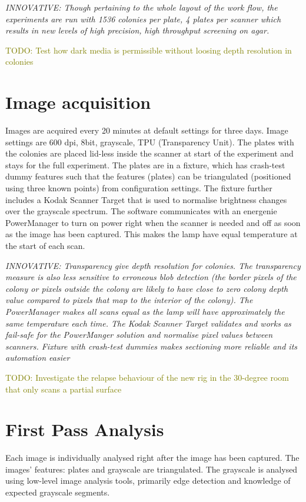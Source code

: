 \documentclass{article}
\newcommand{\todo}[1]{\textcolor{olive}{TODO: #1}}
\newcommand{\innovative}[1]{\emph{INNOVATIVE: #1}}
\begin{document}
\innovative{Though pertaining to the whole layout of the work flow, the
experiments are run with 1536 colonies per plate, 4 plates per scanner
which results in new levels of high precision, high throughput screening
on agar.}

\todo{Test how dark media is permissible without loosing depth resolution
in colonies}

\section{Image acquisition}

Images are acquired every 20 minutes at default settings for three days.
Image settings are 600 dpi, 8bit, grayscale, TPU (Transparency Unit).
The plates with the colonies are placed lid-less inside the scanner at start
of the experiment and stays for the full experiment.
The plates are in a fixture, which has crash-test dummy features such that
the features (plates) can be triangulated (positioned using three known
points) from configuration settings.
The fixture further includes a Kodak Scanner Target that is used to normalise
brightness changes over the grayscale spectrum.
The software communicates with an energenie PowerManager to turn on power right
when the scanner is needed and off as soon as the image has been captured.
This makes the lamp have equal temperature at the start of each scan.

\innovative{Transparency give depth resolution for colonies. 
The transparency measure is also less sensitive to erroneous blob detection
(the border pixels of the colony or pixels outside the colony are likely to
have close to zero colony depth value compared to pixels that map to the 
interior of the colony).
The PowerManager makes all scans equal as the lamp will have approximately 
the same temperature each time.
The Kodak Scanner Target validates and works as fail-safe for the PowerManger
solution and normalise pixel values between scanners.
Fixture with crash-test dummies makes sectioning more reliable and its
automation easier}

\todo{Investigate the relapse behaviour of the new rig in the 30-degree room
that only scans a partial surface}

\section{First Pass Analysis}

Each image is individually analysed right after the image has been captured.
The images' features: plates and grayscale are triangulated.
The grayscale is analysed using low-level image analysis tools, primarily
edge detection and knowledge of expected grayscale segments.
\end{document}
